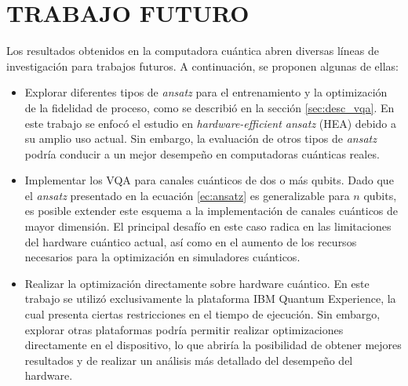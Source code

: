 \documentclass[letterpaper,12pt]{thesisECFM}
\theoremstyle{plain}
\theoremstyle{definition}
\theoremstyle{definition}
\theoremstyle{remark}
\newcommand{\1}{\mathbb{1}}
\begin{document}
\chapter{TRABAJO FUTURO} %
Los resultados obtenidos en la computadora cuántica abren diversas líneas de
investigación para trabajos futuros. A continuación, se proponen algunas de
ellas: 
\begin{itemize}
    \item Explorar diferentes tipos de \textit{ansatz} para el entrenamiento y la optimización de la fidelidad de proceso, como se describió en la sección \ref{sec:desc_vqa}. En este trabajo se enfocó el estudio en \textit{hardware-efficient ansatz} (HEA) debido a su amplio uso actual. Sin embargo, la evaluación de otros tipos de \textit{ansatz} podría conducir a un mejor desempeño en computadoras cuánticas reales.
    
    \item Implementar los VQA para canales cuánticos de dos o más qubits. Dado que el \textit{ansatz} presentado en la ecuación \ref{ec:ansatz} es generalizable para $n$ qubits, es posible extender este esquema a la implementación de canales cuánticos de mayor dimensión. El principal desafío en este caso radica en las limitaciones del hardware cuántico actual, así como en el aumento de los recursos necesarios para la optimización en simuladores cuánticos.
    
    \item Realizar la optimización directamente sobre hardware cuántico. En este trabajo se utilizó exclusivamente la plataforma IBM Quantum Experience, la cual presenta ciertas restricciones en el tiempo de ejecución. Sin embargo, explorar otras plataformas podría permitir realizar optimizaciones directamente en el dispositivo, lo que abriría la posibilidad de obtener mejores resultados y de realizar un análisis más detallado del desempeño del hardware.
\end{itemize}




\end{document}

